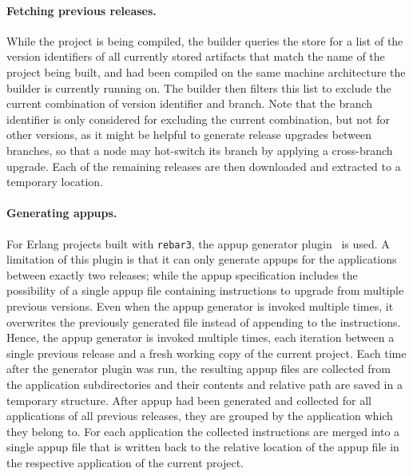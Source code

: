 {\paragraph{Fetching previous releases.} While the project is being compiled, the builder queries the store for a list of the version identifiers of all currently stored artifacts that match the name of the project being built, and had been compiled on the same machine architecture the builder is currently running on. The builder then filters this list to exclude the current combination of version identifier and branch. Note that the branch identifier is only considered for excluding the current combination, but not for other versions, as it might be helpful to generate release upgrades between branches, so that a node may hot-switch its branch by applying a cross-branch upgrade. Each of the remaining releases are then downloaded and extracted to a temporary location.

\paragraph{Generating \acrshort{appup}s.} For Erlang projects built with \lstinline|rebar3|, the \acrlong{appup} generator plugin~\cite{rebar3appup} is used. A limitation of this plugin is that it can only generate \acrshort{appup}s for the applications between exactly two releases; while the \acrshort{appup} specification includes the possibility of a single \acrshort{appup} file containing instructions to upgrade from multiple previous versions. Even when the \acrshort{appup} generator is invoked multiple times, it overwrites the previously generated file instead of appending to the instructions. Hence, the \acrshort{appup} generator is invoked multiple times, each iteration between a single previous release and a fresh working copy of the current project. Each time after the generator plugin was run, the resulting \acrshort{appup} files are collected from the application subdirectories and their contents and relative path are saved in a temporary structure. After \acrlong{appup} had been generated and collected for all applications of all previous releases, they are grouped by the application which they belong to. For each application the collected instructions are merged into a single \acrshort{appup} file that is written back to the relative location of the \acrshort{appup} file in the respective application of the current project.

}

